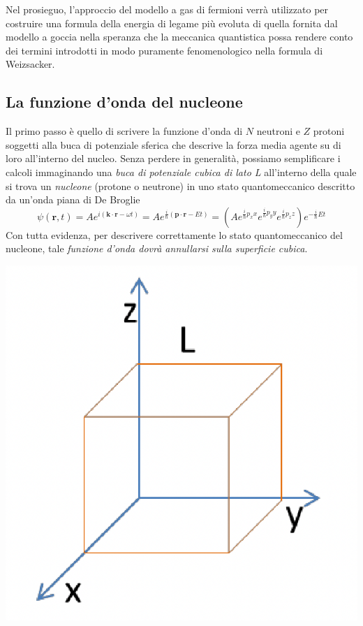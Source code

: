 Nel prosieguo, l’approccio del modello a gas di fermioni verrà utilizzato per costruire una formula della energia di legame più evoluta di quella fornita dal modello a goccia nella speranza che la meccanica quantistica possa rendere conto dei termini introdotti in modo puramente fenomenologico nella formula di Weizsacker.

\subsection{La funzione d'onda del nucleone}\label{sec:funzione-onda-nucleone}

Il primo passo è quello di scrivere la funzione d’onda di $N$ neutroni e $Z$ protoni soggetti alla buca di potenziale sferica che descrive la forza media agente su di loro all’interno del nucleo.
Senza perdere in generalità, possiamo semplificare i calcoli immaginando una \emph{buca di potenziale cubica di lato L} all’interno della quale si trova un \emph{nucleone} (protone o neutrone) in uno stato quantomeccanico descritto da un’onda piana di De Broglie
\[
\psi(\bm{r},t) = A e^{ i(\bm{k} \cdot \bm{r} - \omega t) } =
Ae^{ \frac{i}{\hslash} (\bm{p} \cdot \bm{r} -Et)  } =
(Ae^{ \frac{i}{\hslash}p_{x}x }e^{ \frac{i}{\hslash}p_{y}y }e^{ \frac{i}{\hslash}p_{z}z })e^{ - \frac{i}{\hslash}Et }
\]
Con tutta evidenza, per descrivere correttamente lo stato quantomeccanico del nucleone, tale \emph{funzione d’onda dovrà annullarsi sulla superficie cubica}.
\begin{marginfigure}
	\includegraphics{figs/cube-fermion-gas1}
\end{marginfigure}
